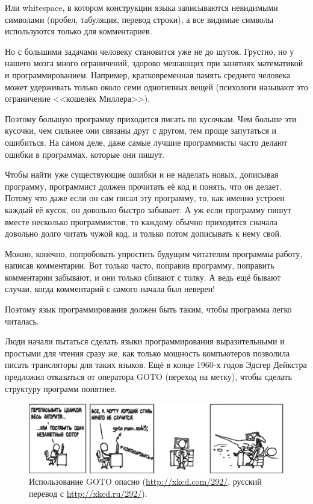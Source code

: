 \documentclass[
  paper=a4,
  fontsize=14pt,
  openany,
  appendixprefix=true
]{scrbook}
\begin{document}
Или whitespace, в котором конструкции языка записываются невидимыми символами (пробел, табуляция, перевод строки), а все видимые символы используются только для комментариев.

Но с большими задачами человеку становится уже не до шуток. Грустно, но у нашего мозга много ограничений, здорово мешающих при занятиях математикой и программированием. Например, кратковременная память среднего человека может удерживать только около семи однотипных вещей (психологи называют это ограничение <<кошелёк Миллера>>).

Поэтому большую программу приходится писать по кусочкам. Чем больше эти кусочки, чем сильнее они связаны друг с другом, тем проще запутаться и ошибиться. На самом деле, даже самые лучшие программисты часто делают ошибки в программах, которые они пишут.

Чтобы найти уже существующие ошибки и не наделать новых, дописывая программу, программист должен прочитать её код и понять, что он делает. Потому что даже если он сам писал эту программу, то, как именно устроен каждый её кусок, он довольно быстро забывает. А уж если программу пишут вместе несколько программистов, то каждому обычно приходится сначала довольно долго читать чужой код, и только потом дописывать к нему свой.

Можно, конечно, попробовать упростить будущим читателям программы работу, написав комментарии. Вот только часто, поправив программу, поправить комментарии забывают, и они только сбивают с толку. А ведь ещё бывают случаи, когда комментарий с самого начала был неверен!

Поэтому язык программирования должен быть таким, чтобы программа легко читалась.


Люди начали пытаться сделать языки программирования выразительными и простыми для чтения сразу же, как только мощность компьютеров позволила писать трансляторы для таких языков. Ещё в конце 1960-х годов Эдсгер Дейкстра предложил отказаться от оператора GOTO (переход на метку), чтобы сделать структуру программ понятнее.

\begin{figure}[!t,goto]
\includegraphics[width=180mm]{goto_russian.ps}
\caption{Использование GOTO опасно (\url{http://xkcd.com/292/}, русский перевод с \url{http://xkcd.ru/292/}).}
\label{goto}
\end{figure}
\end{document}
